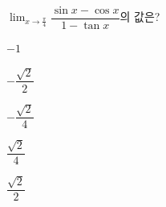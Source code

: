 $\displaystyle\lim_{x\to\frac{\pi}{4}}\dfrac{\sin x-\cos x}{1-\tan x}$의 값은?
\begin{choices32}{\rule[-3ex]{0pt}{8ex}$-1$}{\rule[-3ex]{0pt}{8ex}$-\dfrac{\sqrt{2}}{2}$}{\rule[-3ex]{0pt}{8ex}$-\dfrac{\sqrt{2}}{4}$}{\rule[-3ex]{0pt}{8ex}$\dfrac{\sqrt{2}}{4}$}{\rule[-3ex]{0pt}{8ex}$\dfrac{\sqrt{2}}{2}$}\end{choices32}
